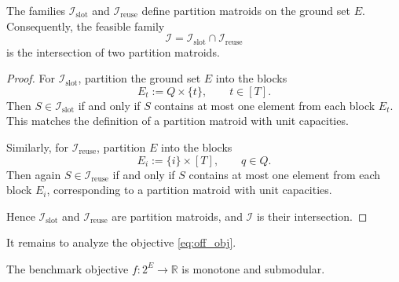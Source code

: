 \documentclass{article}
\begin{document}
\begin{prop}\label{prop:partition_matroids}
The families $\mathcal I_{\text{slot}}$ and
$\mathcal I_{\text{reuse}}$ define partition matroids on the ground set $E$.
Consequently, the feasible family
\[
\mathcal I = \mathcal I_{\text{slot}} \cap \mathcal I_{\text{reuse}}
\]
is the intersection of two partition matroids.
\end{prop}

\begin{proof}
For $\mathcal I_{\text{slot}}$, partition the ground set $E$ into the
blocks
\[
E_t := Q \times \{t\}, \qquad t \in [T].
\]
Then $S \in \mathcal I_{\text{slot}}$ if and only if $S$ contains at most
one element from each block $E_t$. This matches the definition of a
partition matroid with unit capacities.

Similarly, for $\mathcal I_{\text{reuse}}$, partition $E$ into the blocks
\[
E_i := \{i\} \times [T], \qquad q \in Q.
\]
Then again $S \in \mathcal I_{\text{reuse}}$ if and only if $S$ contains at
most one element from each block $E_i$, corresponding to a partition matroid
with unit capacities.

Hence $\mathcal I_{\text{slot}}$ and $\mathcal I_{\text{reuse}}$ are
partition matroids, and $\mathcal I$ is their intersection.
\end{proof}

It remains to analyze the objective \eqref{eq:off_obj}.


\begin{theorem}\label{thm:submodular_offline}
The benchmark objective $f:2^E\to\mathbb R$ is monotone and submodular.
\end{theorem}
\end{document}
